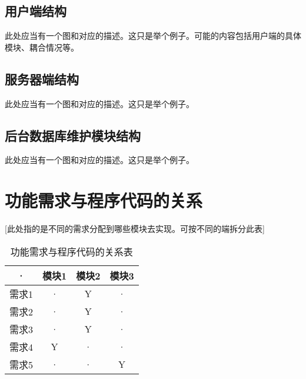 \subsection{用户端结构}
此处应当有一个图和对应的描述。这只是举个例子。可能的内容包括用户端的具体模块、耦合情况等。

\subsection{服务器端结构}
此处应当有一个图和对应的描述。这只是举个例子。

\subsection{后台数据库维护模块结构}
此处应当有一个图和对应的描述。这只是举个例子。



\section{功能需求与程序代码的关系}
[此处指的是不同的需求分配到哪些模块去实现。可按不同的端拆分此表]
\begin{table}[htbp]
\centering
\caption{功能需求与程序代码的关系表} \label{tab:requirement-module}
\begin{tabular}{|c|c|c|c|}
    \hline
    · & 模块1 & 模块2 & 模块3 \\
    \hline
    需求1 & · & Y & · \\
    \hline
    需求2 & · & Y & · \\
    \hline
    需求3 & · & Y & · \\
    \hline
    需求4 & Y & · & · \\
    \hline
    需求5 & · & · & Y \\
    \hline
\end{tabular}
\end{table}